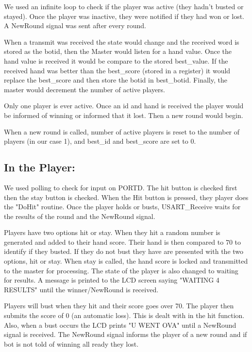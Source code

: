 \documentclass[10pt,letterpaper]{article}
\begin{document}
We used an infinite loop to check if the player was active (they hadn't busted or stayed). Once the player was inactive, they were notified if they had won or lost. A NewRound signal was sent after every round.

When a transmit was received the state would change and the received word is stored as the botid, then the Master would listen for a hand value. Once the hand value is received it would be compare to the stored best\_value. If the received hand was better than the best_score (stored in a register) it would replace the best\_score and then store the botid in best\_botid. Finally, the master would decrement the number of active players.

Only one player is ever active. Once an id and hand is received the player would be informed of winning or informed that it lost. Then a new round would begin.

When a new round is called, number of active players is reset to the number of players (in our case 1), and best\_id and best\_score are set to 0.


\subsection{In the Player:}

We used polling to check for input on PORTD. The hit button is checked first then the stay button is checked. When the Hit button is pressed, they player does the "DoHit" routine. Once the player holds or busts, USART_Receive waits for the results of the round and the NewRound signal.

Players have two options hit or stay. When they hit a random number is generated and added to their hand score.
Their hand is then compared to 70 to identify if they busted. If they do not bust they have are presented with the two options, hit or stay. When stay is called, the hand score is locked and transmitted to the master for processing. The state of the player is also changed to waiting for results. A message is printed to the LCD screen saying "WAITING 4 RESULTS" until the winner/NewRound is received.

Players will bust when they hit and their score goes over 70. The player then submits the score of 0 (an automatic loss). This is dealt with in the hit function. Also, when a bust occurs the LCD prints "U WENT OVA" until a NewRound signal is received. The NewRound signal informs the player of a new round and if bot is not told of winning all ready they lost.
\end{document}
